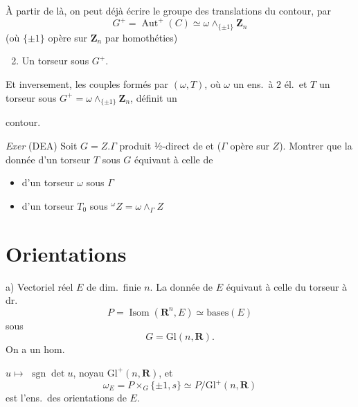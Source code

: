 \documentclass[11pt,a4paper]{article}
\begin{document}
À partir de là, on peut déjà écrire  le groupe des
translations du contour, par
\[
  G^+ = \operatorname{Aut}^+(C) \simeq \omega \wedge_{\{\pm 1\}} \mathbf{Z}_n
\]
(où $\{\pm 1\}$ opère sur $\mathbf{Z}_n$ par homothéties)

\begin{enumerate}
  \setcounter{enumi}{1}
  \item Un torseur sous $G^+$.
\end{enumerate}

 Et inversement, les couples formés par $(\omega, T)$, où
$\omega$ un \struck{\ill{}} ens.\ à $2$ él.\ et $T$ un torseur sous
$G^+ = \omega \wedge_{\{\pm 1\}} \mathbf{Z}_n$, définit un

contour.

\textit{Exer} (DEA) Soit $G = Z.\Gamma$ produit ½-direct de  et
\uncertain{$\Gamma$} ($\Gamma$ opère sur $Z$). Montrer que la donnée d'un
torseur $T$ sous $G$ équivaut à celle de

\begin{itemize}
  \item[a)] d'un torseur $\omega$ sous $\Gamma$
  \item[b)] d'un torseur $T_0$ sous ${}^{\omega}Z = \omega \wedge_{\Gamma} Z$
\end{itemize}

\section*{Orientations}

a) Vectoriel réel $E$ de dim.\ finie $n$. La donnée de $E$ équivaut à celle du
torseur à dr.
\[
  P = \operatorname{Isom}(\mathbf{R}^n, E) \simeq \text{bases}(E)
\]
sous
\[
  G = \mathrm{Gl}(n, \mathbf{R}).
\]
On a un hom.


$u \mapsto$ \struck{$\det$} $\operatorname{sgn} \det u$, noyau
$\mathrm{Gl}^+(n, \mathbf{R})$, et
\[
  \omega_E = P \times_G \{\pm 1, s\} \simeq P / \mathrm{Gl}^+(n, \mathbf{R})
\]
est l'ens.\ des orientations de $E$.
\end{document}
